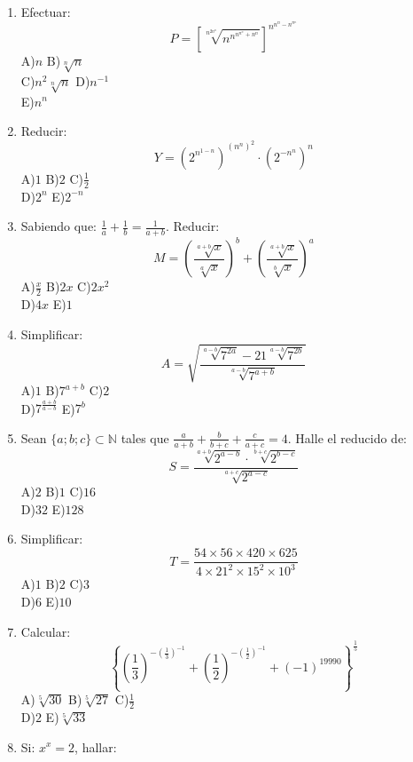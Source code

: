 \documentclass[
  10pt,
]{article}
\begin{document}
\begin{enumerate}
  D)\(81\) E)\(15\)
\item
  Efectuar:\\
  \[P = \left\lbrack \sqrt[n^{2n^{n}}]{n^{n^{n^{n^{n}} + n^{n}}}} \right\rbrack^{n^{n^{n} - n^{n^{n}}}}
  \]A)\(n\) B)\(\sqrt[n]{n}\)\\
  C)\(n^{2}\sqrt[n]{n}\) D)\(n^{- 1}\)\\
  E)\(n^{n}\)
\item
  Reducir:\\
  \[Y = \left( 2^{n^{1 - n}} \right)^{\left( n^{n} \right)^{2}} \cdot \left( 2^{- n^{n}} \right)^{n}
  \]A)\(1\) B)\(2\) C)\(\frac{1}{2}\)\\
  D)\(2^{n}\) E)\(2^{- n}\)
\item
  Sabiendo que: \(\frac{1}{a} + \frac{1}{b} = \frac{1}{a + b}\).
  Reducir:\\
  \[M = \left( \frac{\sqrt[{a + b}]{x}}{\sqrt[a]{x}} \right)^{b} + \left( \frac{\sqrt[{a + b}]{x}}{\sqrt[b]{x}} \right)^{a}
  \]A)\(\frac{x}{2}\) B)\(2x\) C)\(2x^{2}\)\\
  D)\(4x\) E)\(1\)
\item
  Simplificar:\\
  \[A = \sqrt{\frac{\sqrt[{a - b}]{7^{2a}} - 21\sqrt[{a - b}]{7^{2b}}}{\sqrt[{a - b}]{7^{a + b}}}}
  \]A)\(1\) B)\(7^{a + b}\) C)\(2\)\\
  D)\(7^{\frac{a + b}{a - b}}\) E)\(7^{b}\)
\item
  Sean \(\{ a;b;c\mathbb{\} \subset N}\) tales que
  \(\frac{a}{a + b} + \frac{b}{b + c} + \frac{c}{a + c} = 4\). Halle el
  reducido de:\\
  \[S = \frac{\sqrt[{a + b}]{2^{a - b}} \cdot \sqrt[{b + c}]{2^{b - c}}}{\sqrt[{a + c}]{2^{a - c}}}
  \]A)\(2\) B)\(1\) C)\(16\)\\
  D)\(32\) E)\(128\)
\item
  Simplificar:\\
  \[T = \frac{54 \times 56 \times 420 \times 625}{4 \times 21^{2} \times 15^{2} \times 10^{3}}
  \]A)\(1\) B)\(2\) C)\(3\)\\
  D)\(6\) E)\(10\)
\item
  Calcular:\\
  \[\left\{ \left( \frac{1}{3} \right)^{- \left( \frac{1}{3} \right)^{- 1}} + \left( \frac{1}{2} \right)^{- \left( \frac{1}{2} \right)^{- 1}} + ( - 1)^{19990} \right\}^{\frac{1}{5}}
  \]A)\(\sqrt[5]{30}\) B)\(\sqrt[5]{27}\) C)\(\frac{1}{2}\)\\
  D)\(2\) E)\(\sqrt[5]{33}\)
\item
  Si: \(x^{x} = 2\), hallar:\\

\end{enumerate}
\end{document}
